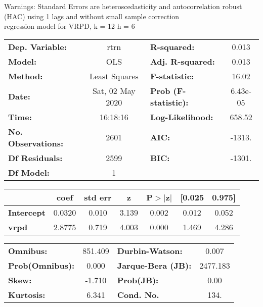 Warnings: \newline
 [1] Standard Errors are heteroscedasticity and autocorrelation robust (HAC) using 1 lags and without small sample correction\\ 

regression model for VRPD, k = 12 h = 6\begin{center}
\begin{tabular}{lclc}
\toprule
\textbf{Dep. Variable:}    &       rtrn       & \textbf{  R-squared:         } &     0.013   \\
\textbf{Model:}            &       OLS        & \textbf{  Adj. R-squared:    } &     0.013   \\
\textbf{Method:}           &  Least Squares   & \textbf{  F-statistic:       } &     16.02   \\
\textbf{Date:}             & Sat, 02 May 2020 & \textbf{  Prob (F-statistic):} &  6.43e-05   \\
\textbf{Time:}             &     16:18:16     & \textbf{  Log-Likelihood:    } &    658.52   \\
\textbf{No. Observations:} &        2601      & \textbf{  AIC:               } &    -1313.   \\
\textbf{Df Residuals:}     &        2599      & \textbf{  BIC:               } &    -1301.   \\
\textbf{Df Model:}         &           1      & \textbf{                     } &             \\
\bottomrule
\end{tabular}
\begin{tabular}{lcccccc}
                   & \textbf{coef} & \textbf{std err} & \textbf{z} & \textbf{P$> |$z$|$} & \textbf{[0.025} & \textbf{0.975]}  \\
\midrule
\textbf{Intercept} &       0.0320  &        0.010     &     3.139  &         0.002        &        0.012    &        0.052     \\
\textbf{vrpd}      &       2.8775  &        0.719     &     4.003  &         0.000        &        1.469    &        4.286     \\
\bottomrule
\end{tabular}
\begin{tabular}{lclc}
\textbf{Omnibus:}       & 851.409 & \textbf{  Durbin-Watson:     } &    0.007  \\
\textbf{Prob(Omnibus):} &   0.000 & \textbf{  Jarque-Bera (JB):  } & 2477.183  \\
\textbf{Skew:}          &  -1.710 & \textbf{  Prob(JB):          } &     0.00  \\
\textbf{Kurtosis:}      &   6.341 & \textbf{  Cond. No.          } &     134.  \\
\bottomrule
\end{tabular}
\end{center}


